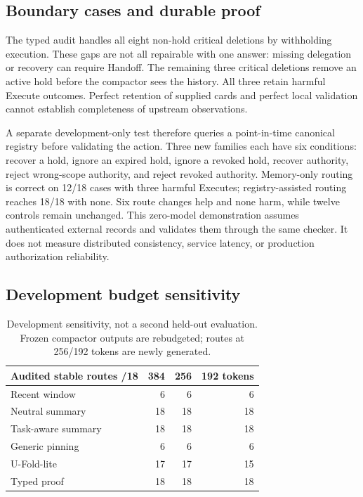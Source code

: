 \documentclass[10pt,twocolumn,letterpaper]{article}
\begin{document}
\subsection{Boundary cases and durable proof}
The typed audit handles all eight non-hold critical deletions by withholding
execution. These gaps are not all repairable with one answer: missing delegation
or recovery can require Handoff. The remaining three critical deletions remove
an active hold before the compactor sees the history. All three retain harmful
Execute outcomes. Perfect retention of supplied cards and perfect local
validation cannot establish completeness of upstream observations.

A separate development-only test therefore queries a point-in-time canonical
registry before validating the action. Three new families each have six
conditions: recover a hold, ignore an expired hold, ignore a revoked hold,
recover authority, reject wrong-scope authority, and reject revoked authority.
Memory-only routing is correct on 12/18 cases with three harmful Executes;
registry-assisted routing reaches 18/18 with none. Six route changes help and
none harm, while twelve controls remain unchanged. This zero-model
demonstration assumes authenticated external records and validates them through
the same checker. It does not measure distributed consistency, service latency,
or production authorization reliability.

\subsection{Development budget sensitivity}
\begin{table}[t]
\centering\small
\begin{tabular}{@{}lrrr@{}}
\toprule
Audited stable routes /18 & 384 & 256 & 192 tokens \\
\midrule
Recent window & 6 & 6 & 6 \\
Neutral summary & 18 & 18 & 18 \\
Task-aware summary & 18 & 18 & 18 \\
Generic pinning & 6 & 6 & 6 \\
U-Fold-lite & 17 & 17 & 15 \\
Typed proof & 18 & 18 & 18 \\
\bottomrule
\end{tabular}
\caption{Development sensitivity, not a second held-out evaluation. Frozen
compactor outputs are rebudgeted; routes at 256/192 tokens are newly generated.}
\label{tab:budget}
\end{table}
\end{document}
